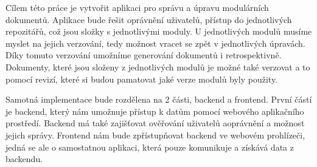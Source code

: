 Cílem této práce je vytvořit aplikaci pro správu a úpravu modulárních dokumentů. Aplikace bude řešit oprávnění uživatelů, přístup do
jednotlivých repozitářů, což jsou složky s jednotlivými moduly. U jednotlivých modulů musíme myslet na jejich verzování, tedy možnost
vracet se zpět v jednotlivých úpravách. Díky tomuto verzování umožníme generování dokumentů i retrospektivně. Dokumenty, které jsou
složeny z jednotlivých modulů je možné také verzovat a to pomocí revizí, které si budou pamatovat jaké verze modulů byly použity.

Samotná implementace bude rozdělena na 2 části, backend a frontend. První částí je backend, který nám umožnuje přístup k datům pomocí webového aplikačního
prostředí. Backend má také zajišťovat ověřování uživatelů a\linebreak oprávnění a možnost jejich správy. Frontend nám bude zpřístupňovat \mbox{backend}
ve webovém prohlízeči, jedná se ale o samostatnou aplikaci, která pouze komunikuje a získává data z backendu.